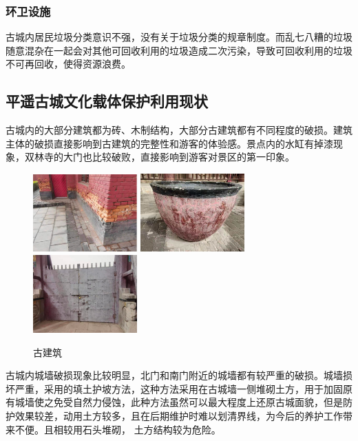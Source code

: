 \documentclass[UTF8]{ctexart}
\begin{document}
        \subsubsection{环卫设施}
        古城内居民垃圾分类意识不强，没有关于垃圾分类的规章制度。而乱七八糟的垃圾随意混杂在一起会对其他可回收利用的垃圾造成二次污染，导致可回收利用的垃圾不可再回收，使得资源浪费。
    \subsection{平遥古城文化载体保护利用现状}
    古城内的大部分建筑都为砖、木制结构，大部分古建筑都有不同程度的破损。建筑主体的破损直接影响到古建筑的完整性和游客的体验感。景点内的水缸有掉漆现象，双林寺的大门也比较破败，直接影响到游客对景区的第一印象。
    \begin{figure}[H]
    \centering
    \includegraphics[width=4cm]{图片 19.png}
    \includegraphics[width=4cm]{图片 20.png}
    \includegraphics[width=4cm]{图片 21.png}
    \caption{古建筑}
    \label{fig:my_label}
    \end{figure}
    古城内城墙破损现象比较明显，北门和南门附近的城墙都有较严重的破损。城墙损坏严重，采用的填土护坡方法，这种方法采用在古城墙一侧堆砌土方，用于加固原有城墙使之免受自然力侵蚀，此种方法虽然可以最大程度上还原古城面貌，但是防护效果较差，动用土方较多，且在后期维护时难以划清界线，为今后的养护工作带来不便。且相较用石头堆砌， 土方结构较为危险。
\end{document}
